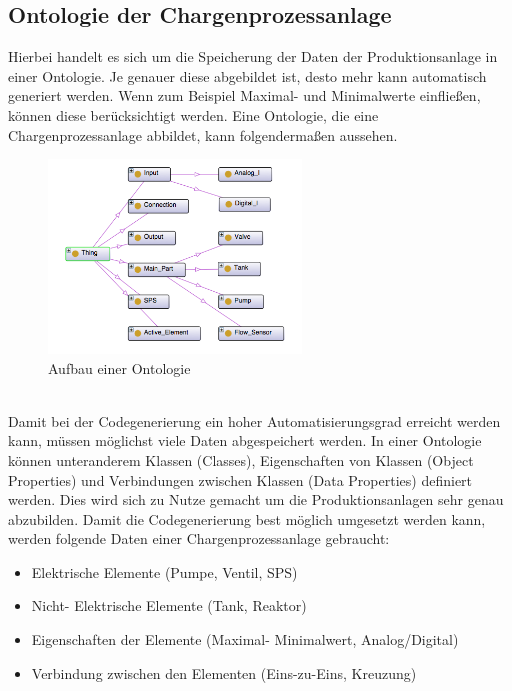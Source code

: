 \subsection{Ontologie der Chargenprozessanlage}
Hierbei handelt es sich um die Speicherung der Daten der Produktionsanlage in einer Ontologie. Je genauer diese abgebildet ist, desto mehr kann automatisch generiert werden. Wenn zum Beispiel Maximal- und Minimalwerte einfließen, können diese berücksichtigt werden.
Eine Ontologie, die eine Chargenprozessanlage abbildet, kann folgendermaßen aussehen. 
\begin{figure}[hbt!]
 \centering
  \includegraphics[width=0.6\textwidth]{graphics/stateoftheart/Ontology_Aufbau}
  \caption{Aufbau einer Ontologie}
\end{figure}\\
Damit bei der Codegenerierung ein hoher Automatisierungsgrad  erreicht werden kann, müssen möglichst viele Daten abgespeichert werden. In einer Ontologie können unteranderem Klassen (Classes), Eigenschaften von Klassen (Object Properties) und Verbindungen zwischen Klassen (Data Properties) definiert werden. Dies wird sich zu Nutze gemacht um die Produktionsanlagen sehr genau abzubilden. Damit die Codegenerierung best möglich umgesetzt werden kann, werden folgende Daten einer Chargenprozessanlage gebraucht:

\begin{itemize}
  \item Elektrische Elemente (Pumpe, Ventil, SPS)
  \item Nicht- Elektrische Elemente (Tank, Reaktor)
  \item Eigenschaften der Elemente (Maximal- Minimalwert, Analog/Digital)
  \item Verbindung zwischen den Elementen (Eins-zu-Eins, Kreuzung)
\end{itemize}

